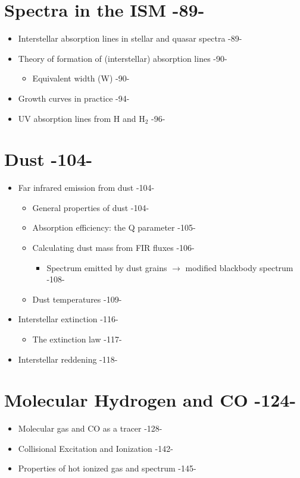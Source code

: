\documentclass[12pt]{article}
\begin{document}
\section{Spectra in the ISM -89-}
\begin{itemize}
    \item Interstellar absorption lines in stellar and quasar spectra -89-
    \item Theory of formation of (interstellar) absorption lines -90-
        \begin{itemize}
            \item Equivalent width (W) -90-
        \end{itemize}
    \item Growth curves in practice -94-
    \item UV absorption lines from H and H$_2$ -96-
\end{itemize}

\section{Dust -104-}
    \begin{itemize}
  \item Far infrared emission from dust -104-
  \begin{itemize}
    \item General properties of dust -104-
    \item Absorption efficiency: the Q parameter -105-
    \item Calculating dust mass from FIR fluxes -106-
    \begin{itemize}
      \item Spectrum emitted by dust grains $\rightarrow$
      modified blackbody spectrum -108-
    \end{itemize}
    \item Dust temperatures -109-
  \end{itemize}
  \item Interstellar extinction -116-
  \begin{itemize}
    \item The extinction law -117-
  \end{itemize}
  \item Interstellar reddening -118-
    \end{itemize}

\section{Molecular Hydrogen and CO -124-}
      \begin{itemize}
  \item Molecular gas and CO as a tracer -128-
  \item Collisional Excitation and Ionization -142-
  \item Properties of hot ionized gas and spectrum -145-
  \end{itemize}
\end{document}
